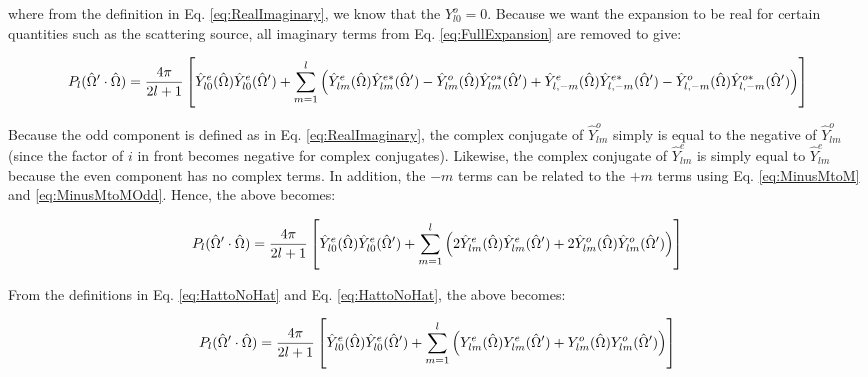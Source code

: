 where from the definition in Eq. \eqref{eq:RealImaginary}, we know that the \(Y_{l0}^o=0\). Because we want the expansion to be real for certain quantities such as the scattering source, all imaginary terms from Eq. \eqref{eq:FullExpansion} are removed to give:

\begin{equation}
\begin{aligned}
\label{eq:FullExpansion2}
P_l(\hat{\Omega}  '\cdot\hat{\Omega}  )=\frac{4\pi}{2l+1}\left\lbrack \hat{Y}_{l0}^e(\hat{\Omega}  )\hat{Y}_{l0}^e(\hat{\Omega}  ')+\sum_{m=1}^{l}\left(\hat{Y}_{lm}^e(\hat{\Omega}  )\hat{Y}_{lm}^{e*}(\hat{\Omega}  ')-\hat{Y}_{lm}^o(\hat{\Omega}  )\hat{Y}_{lm}^{o*}(\hat{\Omega}  ')+\hat{Y}_{l,-m}^e(\hat{\Omega}  )\hat{Y}_{l,-m}^{e*}(\hat{\Omega}  ')-\hat{Y}_{l,-m}^o(\hat{\Omega}  )\hat{Y}_{l,-m}^{o*}(\hat{\Omega}  ')\right)\right\rbrack\\
\end{aligned}
\end{equation}

Because the odd component is defined as in Eq. \eqref{eq:RealImaginary}, the complex conjugate of \(\hat{Y}_{lm}^o\) simply is equal to the negative of \(\hat{Y}_{lm}^o\) (since the factor of \(i\) in front becomes negative for complex conjugates). Likewise, the complex conjugate of \(\hat{Y}_{lm}^e\) is simply equal to \(\hat{Y}_{lm}^e\) because the even component has no complex terms. In addition, the \(-m\) terms can be related to the \(+m\) terms using Eq. \eqref{eq:MinusMtoM} and \eqref{eq:MinusMtoMOdd}. Hence, the above becomes:

\begin{equation}
\begin{aligned}
\label{eq:FullExpansion3}
P_l(\hat{\Omega}  '\cdot\hat{\Omega}  )=\frac{4\pi}{2l+1}\left\lbrack \hat{Y}_{l0}^e(\hat{\Omega}  )\hat{Y}_{l0}^e(\hat{\Omega}  ')+\sum_{m=1}^{l}\left(2\hat{Y}_{lm}^e(\hat{\Omega}  )\hat{Y}_{lm}^{e}(\hat{\Omega}  ')+2\hat{Y}_{lm}^o(\hat{\Omega}  )\hat{Y}_{lm}^{o}(\hat{\Omega}  ')\right)\right\rbrack\\
\end{aligned}
\end{equation}

From the definitions in Eq. \eqref{eq:HattoNoHat} and Eq. \eqref{eq:HattoNoHat}, the above becomes:

\begin{equation}
\begin{aligned}
\label{eq:FullExpansion4}
P_l(\hat{\Omega}  '\cdot\hat{\Omega}  )=\frac{4\pi}{2l+1}\left\lbrack \hat{Y}_{l0}^e(\hat{\Omega}  )\hat{Y}_{l0}^e(\hat{\Omega}  ')+\sum_{m=1}^{l}\left(Y_{lm}^e(\hat{\Omega}  )Y_{lm}^{e}(\hat{\Omega}  ')+Y_{lm}^o(\hat{\Omega}  )Y_{lm}^{o}(\hat{\Omega}  ')\right)\right\rbrack\\
\end{aligned}
\end{equation}

